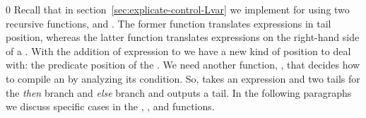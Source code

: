 \documentclass[7x10]{TimesAPriori_MIT}%
\def\racketEd{0}
\def\edition{0}
\numberwithin{theorem}{chapter}
\numberwithin{definition}{chapter}
\numberwithin{equation}{chapter}
\begin{document}
{\if\edition\racketEd        
%
Recall that in section~\ref{sec:explicate-control-Lvar} we implement
 for \LangVar{} using two recursive
functions,  and .  The
former function translates expressions in tail position, whereas the
latter function translates expressions on the right-hand side of a
. With the addition of  expression to \LangIf{} we
have a new kind of position to deal with: the predicate position of
the . We need another function, , that
decides how to compile an  by analyzing its condition.  So,
 takes an \LangIf{} expression and two
\LangCIf{} tails for the \emph{then} branch and \emph{else} branch
and outputs a tail.  In the following paragraphs we discuss specific
cases in the , , and
 functions.
%
\fi}
%
\end{document}
